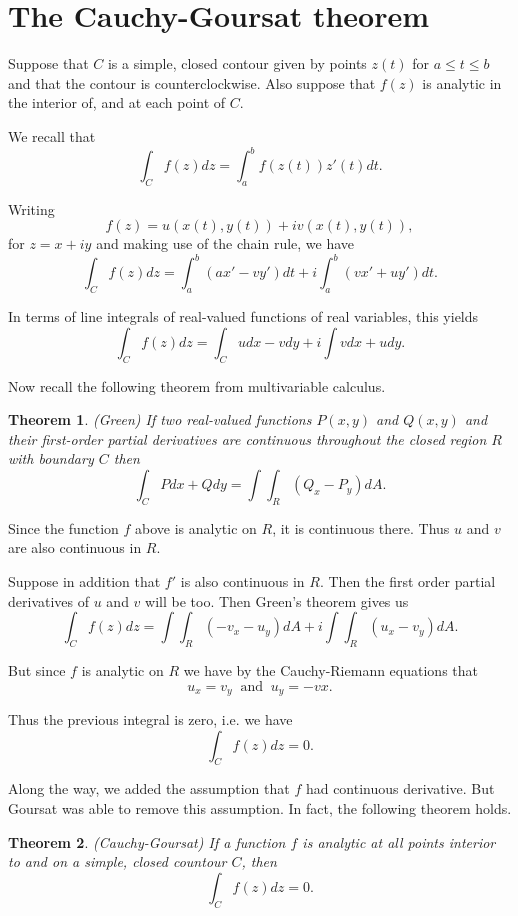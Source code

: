 \documentclass[a4paper,10pt]{article}
\newtheorem{theorem}{Theorem}[section]
\begin{document}
\section{The Cauchy-Goursat theorem}

Suppose that $C$ is a simple, closed contour given by points $z(t)$ for $a \leq t \leq b$ and that the contour is counterclockwise. Also suppose that $f(z)$ is analytic in the interior of, and at each point of $C$.

We recall that
$$\int_C f(z)dz = \int_a^b f(z(t))z'(t)dt.$$

Writing
$$f(z) = u(x(t), y(t)) + iv(x(t), y(t)),$$
for $z = x + iy$ and making use of the chain rule, we have
$$\int_C f(z)dz = \int_a^b (ax' - vy')dt + i\int_a^b (vx' + uy')dt.$$

In terms of line integrals of real-valued functions of real variables, this yields
$$\int_C f(z)dz = \int_C udx - vdy + i\int vdx + udy.$$

Now recall the following theorem from multivariable calculus.

\begin{theorem} (Green)
If two real-valued functions $P(x, y)$ and $Q(x, y)$ and their first-order partial derivatives are continuous throughout the closed region $R$ with boundary $C$ then
$$\int_C Pdx + Qdy = \int \int_R (Q_x - P_y)dA.$$
\end{theorem}

Since the function $f$ above is analytic on $R$, it is continuous there. Thus $u$ and $v$ are also continuous in $R$.

Suppose in addition that $f'$ is also continuous in $R$. Then the first order partial derivatives of $u$ and $v$ will be too. Then Green's theorem gives us
$$\int_C f(z) dz = \int \int_R (-v_x - u_y)dA + i\int \int_R (u_x - v_y)dA.$$

But since $f$ is analytic on $R$ we have by the Cauchy-Riemann equations that
$$u_x = v_y \;\;\mbox{and}\;\; u_y = -vx.$$

Thus the previous integral is zero, i.e. we have
$$\int_C f(z) dz = 0.$$

Along the way, we added the assumption that $f$ had continuous derivative. But Goursat was able to remove this assumption. In fact, the following theorem holds.

\begin{theorem} (Cauchy-Goursat)
If a function $f$ is analytic at all points interior to and on a simple, closed countour $C$, then
$$\int_C f(z)dz = 0.$$
\end{theorem}
\end{document}

